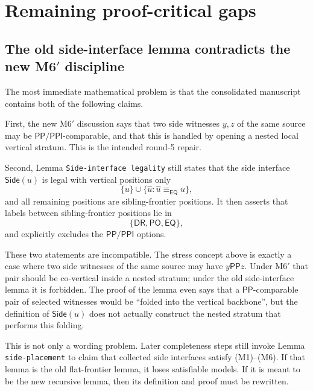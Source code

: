 \documentclass[11pt]{article}
\newcommand{\EQ}{\mathsf{EQ}}
\newcommand{\DR}{\mathsf{DR}}
\newcommand{\PO}{\mathsf{PO}}
\newcommand{\PP}{\mathsf{PP}}
\newcommand{\PPI}{\mathsf{PPI}}
\newcommand{\Side}{\mathsf{Side}}
\newcommand{\eqc}{\equiv_{\EQ}}
\begin{document}
\section{Remaining proof-critical gaps}

\subsection{The old side-interface lemma contradicts the new M6$'$ discipline}
\label{ssec:side-contradiction}

The most immediate mathematical problem is that the consolidated manuscript
contains both of the following claims.

First, the new M6$'$ discussion says that two side witnesses $y,z$ of the same
source may be $\PP/\PPI$-comparable, and that this is handled by opening a
nested local vertical stratum.  This is the intended round-5 repair.

Second, Lemma \texttt{Side-interface legality} still states that the side
interface $\Side(u)$ is legal with vertical positions only
\[
  \{u\}\cup\{\widehat u:\widehat u\eqc u\},
\]
and all remaining positions are sibling-frontier positions.  It then asserts
that labels between sibling-frontier positions lie in
\[
  \{\DR,\PO,\EQ\},
\]
and explicitly excludes the $\PP/\PPI$ options.

These two statements are incompatible.  The stress concept above is exactly a
case where two side witnesses of the same source may have $y\PP z$.  Under
M6$'$ that pair should be co-vertical inside a nested stratum; under the old
side-interface lemma it is forbidden.  The proof of the lemma even says that a
$\PP$-comparable pair of selected witnesses would be ``folded into the vertical
backbone'', but the definition of $\Side(u)$ does not actually construct the
nested stratum that performs this folding.

This is not only a wording problem.  Later completeness steps still invoke
Lemma \texttt{side-placement} to claim that collected side interfaces satisfy
(M1)--(M6).  If that lemma is the old flat-frontier lemma, it loses satisfiable
models.  If it is meant to be the new recursive lemma, then its definition and
proof must be rewritten.
\end{document}
